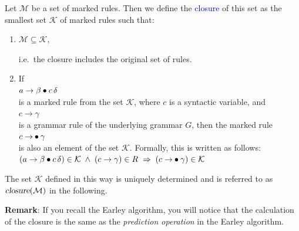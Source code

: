 \begin{Definition}
  Let \(\mathcal{M}\) be a set of marked rules. Then we define the \textcolor{blue}{closure}  of this set as the smallest set \(\mathcal{K}\) of marked rules such that:
  \begin{enumerate}
  \item \(\mathcal{M} \subseteq \mathcal{K}\),

        i.e.~the closure includes the original set of rules.
  \item If 
        \\[0.2cm]
        \hspace*{1.3cm}
        \(a \rightarrow \beta \mdot c\, \delta\)
        \\[0.2cm]
        is a marked rule from the set \(\mathcal{K}\), where \(c\) is a syntactic variable, and 
        \\[0.2cm]
        \hspace*{1.3cm}
        \(c \rightarrow \gamma\)
        \\[0.2cm]
        is a grammar rule of the underlying grammar \(G\), then the marked rule 
        \\[0.2cm]
        \hspace*{1.3cm}
        \(c \rightarrow \mdot \gamma\)
        \\[0.2cm]
        is also an element of the set \(\mathcal{K}\). Formally, this is written as follows:
        \\[0.2cm]
        \hspace*{1.3cm}
        \((a \rightarrow \beta \mdot c\, \delta) \in \mathcal{K} 
         \;\wedge\; 
         (c \rightarrow \gamma) \in R
         \;\Rightarrow\; (c \rightarrow \mdot \gamma) \in \mathcal{K}
        \)
  \end{enumerate}
  The set \(\mathcal{K}\) defined in this way is uniquely determined and is referred to as \(\textsl{closure}(\mathcal{M})\)  in the following. \eox
\end{Definition}

\noindent
\textbf{Remark}: If you recall the Earley algorithm, you will notice that the calculation of the closure is the
same as the \emph{prediction operation} in the Earley algorithm. \eox 
\vspace*{0.3cm}

